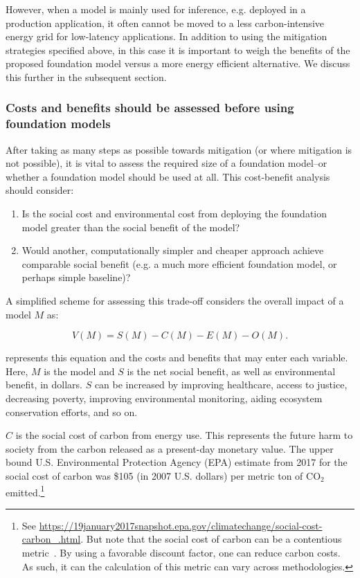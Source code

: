 However, when a model is mainly used for inference, e.g. deployed in a production application, it often cannot be moved to a less carbon-intensive energy grid for low-latency applications. In addition to using the mitigation strategies specified above, in this case it is important to weigh the benefits of the proposed foundation model versus a more energy efficient alternative. We discuss this further in the subsequent section.

\subsubsection{Costs and benefits should be assessed before using foundation models}
\label{sec:environment-costs}

After taking as many steps as possible towards mitigation (or where mitigation is not possible), it is vital to assess the required size of a foundation model--or whether a foundation model should be used at all. This cost-benefit analysis should consider:

\begin{enumerate}
    \item Is the social cost and environmental cost from deploying the foundation model greater than the social benefit of the model?
    \item Would another, computationally simpler and cheaper approach achieve comparable social benefit (e.g. a much more efficient foundation model, or perhaps simple baseline)?
\end{enumerate}

A simplified scheme for assessing this trade-off considers the overall impact of a model $M$ as:

\begin{equation}
\label{eqn:env}
    V(M) = S(M) - C(M) - E(M) - O(M).
\end{equation}

 represents this equation and the costs and benefits that may enter each variable. Here, $M$ is the model and $S$ is the net social benefit, as well as environmental benefit, in dollars. $S$ can be increased by improving healthcare, access to justice, decreasing poverty, improving environmental monitoring, aiding ecosystem conservation efforts, and so on. 

$C$ is the social cost of carbon from energy use. This represents the future harm to society from the carbon released as a present-day monetary value. The upper bound U.S. Environmental Protection Agency (EPA) estimate from 2017 for the social cost of carbon was \$105 (in 2007 U.S. dollars) per metric ton of $\text{CO}_2$ emitted.\footnote{See \url{https://19january2017snapshot.epa.gov/climatechange/social-cost-carbon_.html}. But note that the social cost of carbon can be a contentious metric~\citep{stern2021social}. By using a favorable discount factor, one can reduce carbon costs. As such, it can the calculation of this metric can vary across methodologies.} 

